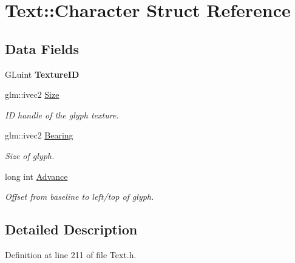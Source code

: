\hypertarget{struct_text_1_1_character}{}\section{Text\+:\+:Character Struct Reference}
\label{struct_text_1_1_character}
\subsection*{Data Fields}
\begin{DoxyCompactItemize}
\item 
G\+Luint {\bfseries Texture\+ID}\hypertarget{struct_text_1_1_character_af360b406edc3ed9092ce7e233ae3acc8}{}\label{struct_text_1_1_character_af360b406edc3ed9092ce7e233ae3acc8}

\item 
glm\+::ivec2 \hyperlink{struct_text_1_1_character_ad4c2b88bfc1232dec53699b361231ca3}{Size}\hypertarget{struct_text_1_1_character_ad4c2b88bfc1232dec53699b361231ca3}{}\label{struct_text_1_1_character_ad4c2b88bfc1232dec53699b361231ca3}

\begin{DoxyCompactList}\small\item\em ID handle of the glyph texture. \end{DoxyCompactList}\item 
glm\+::ivec2 \hyperlink{struct_text_1_1_character_a2bfdd54e6722da034311bb89e8059336}{Bearing}\hypertarget{struct_text_1_1_character_a2bfdd54e6722da034311bb89e8059336}{}\label{struct_text_1_1_character_a2bfdd54e6722da034311bb89e8059336}

\begin{DoxyCompactList}\small\item\em Size of glyph. \end{DoxyCompactList}\item 
long int \hyperlink{struct_text_1_1_character_aa110a0ca88b692cbce2b19a4211ff20d}{Advance}\hypertarget{struct_text_1_1_character_aa110a0ca88b692cbce2b19a4211ff20d}{}\label{struct_text_1_1_character_aa110a0ca88b692cbce2b19a4211ff20d}

\begin{DoxyCompactList}\small\item\em Offset from baseline to left/top of glyph. \end{DoxyCompactList}\end{DoxyCompactItemize}


\subsection{Detailed Description}


Definition at line 211 of file Text.\+h.

